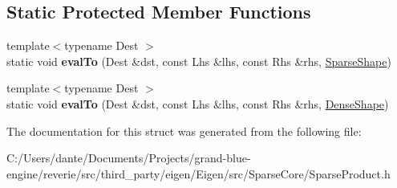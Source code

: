 \subsection*{Static Protected Member Functions}
\begin{DoxyCompactItemize}
\item 
\mbox{\label{struct_eigen_1_1internal_1_1generic__product__impl_3_01_lhs_00_01_rhs_00_01_sparse_shape_00_01_s0f15bf86456099378e4a76f37323e721_a95fc81a20075b0f4d8b2dc2b7a7f4072}} 
{\footnotesize template$<$typename Dest $>$ }\\static void {\bfseries eval\+To} (Dest \&dst, const Lhs \&lhs, const Rhs \&rhs, \mbox{\hyperlink{struct_eigen_1_1_sparse_shape}{Sparse\+Shape}})
\item 
\mbox{\label{struct_eigen_1_1internal_1_1generic__product__impl_3_01_lhs_00_01_rhs_00_01_sparse_shape_00_01_s0f15bf86456099378e4a76f37323e721_a2ac8a7fd6756f40d114adb7815bddc39}} 
{\footnotesize template$<$typename Dest $>$ }\\static void {\bfseries eval\+To} (Dest \&dst, const Lhs \&lhs, const Rhs \&rhs, \mbox{\hyperlink{struct_eigen_1_1_dense_shape}{Dense\+Shape}})
\end{DoxyCompactItemize}


The documentation for this struct was generated from the following file\+:\begin{DoxyCompactItemize}
\item 
C\+:/\+Users/dante/\+Documents/\+Projects/grand-\/blue-\/engine/reverie/src/third\+\_\+party/eigen/\+Eigen/src/\+Sparse\+Core/Sparse\+Product.\+h\end{DoxyCompactItemize}
